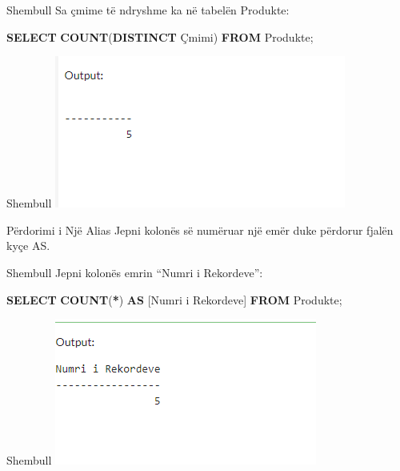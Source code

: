 \documentclass[
  ignorenonframetext,
]{beamer}
\newenvironment{Shaded}{\begin{snugshade}}{\end{snugshade}}
\newcommand{\FunctionTok}[1]{\textcolor[rgb]{0.13,0.29,0.53}{\textbf{#1}}}
\newcommand{\KeywordTok}[1]{\textcolor[rgb]{0.13,0.29,0.53}{\textbf{#1}}}
\newcommand{\NormalTok}[1]{#1}
\newcommand{\OperatorTok}[1]{\textcolor[rgb]{0.81,0.36,0.00}{\textbf{#1}}}
\begin{document}
\begin{frame}[fragile]{Shembull}
\label{shembull-29}
Sa çmime të ndryshme ka në tabelën Produkte:


\begin{Shaded}
\begin{Highlighting}[]
\KeywordTok{SELECT} \FunctionTok{COUNT}\NormalTok{(}\KeywordTok{DISTINCT}\NormalTok{ Çmimi)}
\KeywordTok{FROM}\NormalTok{ Produkte;}
\end{Highlighting}
\end{Shaded}
\end{frame}

\begin{frame}{Shembull}
\label{shembull-30}
\includegraphics{./Figs/query46.png}
\end{frame}

\begin{frame}{Përdorimi i Një Alias}
\label{puxebrdorimi-i-njuxeb-alias}
Jepni kolonës së numëruar një emër duke përdorur fjalën kyçe AS.
\end{frame}

\begin{frame}[fragile]{Shembull}
\label{shembull-31}
Jepni kolonës emrin ``Numri i Rekordeve'':


\begin{Shaded}
\begin{Highlighting}[]
\KeywordTok{SELECT} \FunctionTok{COUNT}\NormalTok{(}\OperatorTok{*}\NormalTok{) }\KeywordTok{AS}\NormalTok{ [Numri i Rekordeve]}
\KeywordTok{FROM}\NormalTok{ Produkte;}
\end{Highlighting}
\end{Shaded}
\end{frame}

\begin{frame}{Shembull}
\label{shembull-32}
\includegraphics{./Figs/query48.png}
\end{frame}
\end{document}
